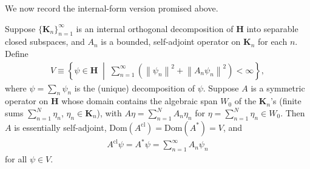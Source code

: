 We now record the internal-form version promised above.

\begin{proposition}
    \label{prpstn:hall-9.26-internal}
    \leanok
    Suppose $\{ \mathbf{K}_n \}_{n=1}^\infty$ is an internal orthogonal decomposition of $\mathbf{H}$ into separable closed subspaces, and $A_n$ is a bounded, self-adjoint operator on $\mathbf{K}_n$ for each $n$. Define
    \begin{align}
        V \equiv \left\{ \psi \in \mathbf{H} \;\middle|\; \sum_{n=1}^\infty \left( \left\| \psi_n \right\|^2 + \left\| A_n \psi_n \right\|^2 \right) < \infty \right\},
    \end{align}
    where $\psi = \sum_n \psi_n$ is the (unique) decomposition of $\psi$. Suppose $A$ is a symmetric operator on $\mathbf{H}$ whose domain contains the algebraic span $W_0$ of the $\mathbf{K}_n$'s (finite sums $\sum_{n=1}^N \eta_n$, $\eta_n \in \mathbf{K}_n$), with $A\eta = \sum_{n=1}^N A_n\eta_n$ for $\eta = \sum_{n=1}^N \eta_n \in W_0$. Then $A$ is essentially self-adjoint, $\text{Dom}(A^{\text{cl}}) = \text{Dom}(A^*) = V$, and
    \begin{align}
        A^{\text{cl}}\psi = A^*\psi = \sum_{n=1}^\infty A_n \psi_n
    \end{align}
    for all $\psi \in V$.
\end{proposition}
